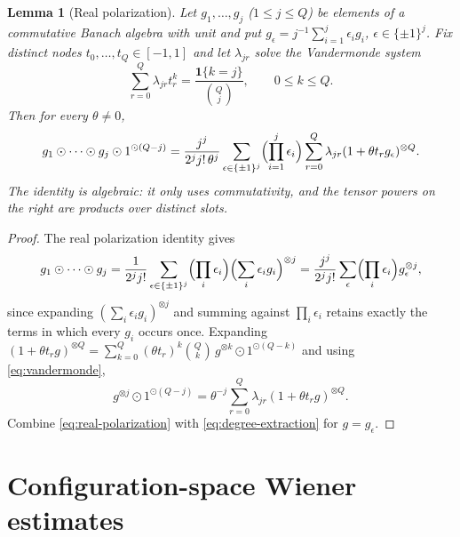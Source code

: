\documentclass[11pt]{article}
\newtheorem{lemma}[lemma]{Lemma}
\newcommand{\od}{\mathbin{\odot}}
\newcommand{\one}{\mathbf{1}}
\begin{document}
\begin{lemma}[Real polarization]\label{lem:polarization-identity}
Let \(g_1,\dots,g_j\) (\(1\le j\le Q\)) be elements of a commutative Banach
algebra with unit and put \(g_\epsilon=j^{-1}\sum_{i=1}^j\epsilon_ig_i\),
\(\epsilon\in\{\pm1\}^j\).  Fix distinct nodes \(t_0,\dots,t_Q\in[-1,1]\) and
let \(\lambda_{jr}\) solve the Vandermonde system
\begin{equation}
 \sum_{r=0}^Q\lambda_{jr}t_r^k=\frac{\one\{k=j\}}{\binom Qj},\qquad 0\le k\le Q .
 \label{eq:vandermonde}
\end{equation}
Then for every \(\theta\ne0\),
\begin{equation}
 g_1\od\cdots\od g_j\od1^{\od(Q-j)}
 =\frac{j^j}{2^jj!\,\theta^j}\sum_{\epsilon\in\{\pm1\}^j}\Bigl(\prod_{i=1}^j\epsilon_i\Bigr)
 \sum_{r=0}^{Q}\lambda_{jr}(1+\theta t_rg_\epsilon)^{\otimes Q}.
 \label{eq:polarization-identity}
\end{equation}
The identity is algebraic: it only uses commutativity, and the tensor
powers on the right are products over distinct slots.
\end{lemma}
\begin{proof}
The real polarization identity gives
\begin{equation}
 g_1\od\cdots\od g_j
 =\frac1{2^jj!}\sum_{\epsilon\in\{\pm1\}^j}\Bigl(\prod_i\epsilon_i\Bigr)
 \Bigl(\sum_i\epsilon_ig_i\Bigr)^{\otimes j}
 =\frac{j^j}{2^jj!}\sum_\epsilon\Bigl(\prod_i\epsilon_i\Bigr)g_\epsilon^{\otimes j},
 \label{eq:real-polarization}
\end{equation}
since expanding \((\sum_i\epsilon_ig_i)^{\otimes j}\) and summing against
\(\prod_i\epsilon_i\) retains exactly the terms in which every \(g_i\)
occurs once.  Expanding \((1+\theta t_rg)^{\otimes Q}=\sum_{k=0}^Q(\theta t_r)^k\binom Qk\,g^{\otimes k}\od1^{\od(Q-k)}\)
and using \eqref{eq:vandermonde},
\begin{equation}
 g^{\otimes j}\od1^{\od(Q-j)}=\theta^{-j}\sum_{r=0}^Q\lambda_{jr}(1+\theta t_rg)^{\otimes Q}.
 \label{eq:degree-extraction}
\end{equation}
Combine \eqref{eq:real-polarization} with \eqref{eq:degree-extraction}
for \(g=g_\epsilon\).
\end{proof}

\section{Configuration-space Wiener estimates}\label{sec:wiener-config}
\end{document}
